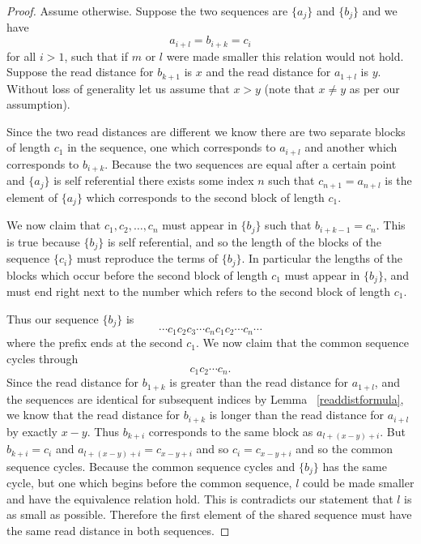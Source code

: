 \documentclass[runningheads,a4paper]{llncs}
\begin{document}
\begin{proof}
Assume otherwise. Suppose the two sequences are $\{a_j\}$ and $\{b_j\}$ and we have 
\begin{equation*}
a_{i+l} = b_{i+k} = c_{i}
\end{equation*}
for all $i>1$, such that if $m$ or $l$ were made smaller this relation would not hold. Suppose the read distance for $b_{k+1}$ is $x$ and the read distance for $a_{1+l}$ is $y$. Without loss of generality let us assume that $x>y$ (note that $x \neq y$ as per our assumption).

Since the two read distances are different we know there are two separate blocks of length $c_1$ in the sequence, one which corresponds to $a_{i+l}$ and another which corresponds to $b_{i+k}$. 
Because the two sequences are equal after a certain point and $\{a_j\}$ is self referential there exists some index $n$ such that $c_{n+1}=a_{n+l}$ is the element of $\{a_j\}$ which corresponds to the second block of length $c_1$. 

We now claim that $c_1, c_2, \ldots, c_{n}$  must appear in $\{b_j\}$ such that $b_{i+k-1}=c_{n}$. This is true because $\{b_j\}$ is self referential, and so the length of the blocks of the sequence $\{c_i\}$ must reproduce the terms of $\{b_j\}$. In particular the lengths of the blocks which occur before the second block of length $c_1$ must appear in $\{b_j\}$, and must end right next to the number which refers to the second block of length $c_1$. 

Thus our sequence $\{b_j\}$ is  
\begin{equation*}
\cdots c_1 c_2 c_3 \cdots c_{n} c_1 c_2 \cdots c_n \cdots
\end{equation*}
where the prefix ends at the second $c_1$. We now claim that the common sequence cycles through
\begin{equation*}
c_1 c_2 \cdots c_n.
\end{equation*}
Since the read distance for $b_{1+k}$ is greater than the read distance for $a_{1+l}$, and the sequences are identical for subsequent indices by Lemma ~\ref{readdistformula}, we know that the read distance for $b_{i+k}$ is longer than the read distance for $a_{i+l}$ by exactly $x-y$. Thus $b_{k+i}$ corresponds to the same block as $a_{l+(x-y)+i}$. But $b_{k+i} = c_{i}$ and $a_{l+(x-y)+i}=c_{x-y+i}$ and so $c_{i} = c_{x-y+i}$ and so the common sequence cycles. Because the common sequence cycles and $\{b_j\}$ has the same cycle, but one which begins before the common sequence, $l$ could be made smaller and have the equivalence relation hold. This is contradicts our statement that $l$ is as small as possible. Therefore the first element of the shared sequence must have the same read distance in both sequences. 
\end{proof}
\end{document}
